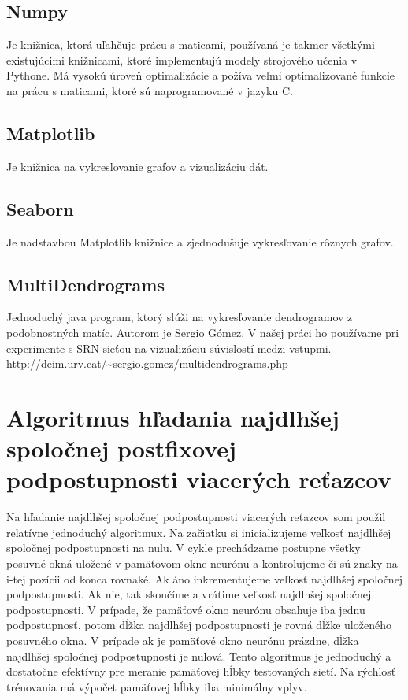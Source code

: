 \subsection{Numpy}
Je knižnica, ktorá uľahčuje prácu s maticami, používaná je takmer všetkými existujúcimi
knižnicami, ktoré implementujú modely strojového učenia v Pythone. Má vysokú úroveň optimalizácie
a požíva veľmi optimalizované funkcie na prácu s maticami, ktoré sú naprogramované v jazyku C.
\subsection{Matplotlib}
Je knižnica na vykresľovanie grafov a vizualizáciu dát.
\subsection{Seaborn}
Je nadstavbou Matplotlib knižnice a zjednodušuje vykresľovanie rôznych grafov.
\subsection{MultiDendrograms}
Jednoduchý java program, ktorý slúži na vykresľovanie dendrogramov z podobnostných matíc. 
Autorom je Sergio Gómez. V našej práci ho používame pri experimente s SRN sieťou na vizualizáciu
súvislostí medzi vstupmi.
\url{http://deim.urv.cat/~sergio.gomez/multidendrograms.php}


\section{Algoritmus hľadania najdlhšej spoločnej postfixovej podpostupnosti viacerých reťazcov}
Na hľadanie najdlhšej spoločnej podpostupnosti viacerých reťazcov som použil relatívne jednoduchý algoritmux.
Na začiatku si inicializujeme veľkosť najdlhšej spoločnej podpostupnosti na nulu.
V cykle prechádzame postupne všetky posuvné okná uložené v pamäťovom okne neurónu a kontrolujeme
či sú znaky na i-tej pozícii od konca rovnaké. Ak áno inkrementujeme veľkosť najdlhšej spoločnej podpostupnosti.
Ak nie, tak skončíme a vrátime veľkosť najdlhšej spoločnej podpostupnosti.
V prípade, že pamäťové okno neurónu obsahuje iba jednu podpostupnosť, potom dĺžka najdlhšej podpostupnosti je 
rovná dĺžke uloženého posuvného okna. V prípade ak je pamäťové okno neurónu prázdne, dĺžka najdlhšej spoločnej
podpostupnosti je nulová.
Tento algoritmus je jednoduchý a dostatočne efektívny pre meranie pamäťovej hĺbky testovaných sietí. 
Na rýchlosť trénovania má výpočet pamäťovej hĺbky iba minimálny vplyv.

